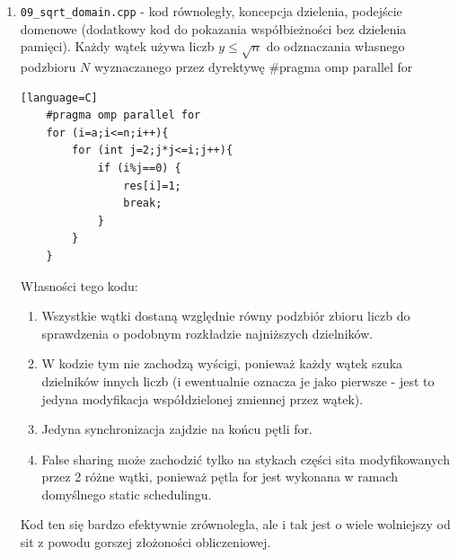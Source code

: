 \documentclass[12pt]{article}
\begin{document}
\begin {enumerate}
	\item \texttt{09\_sqrt\_domain.cpp} - kod równoległy, koncepcja dzielenia, podejście domenowe (dodatkowy kod do pokazania współbieżności bez dzielenia pamięci). Każdy wątek używa liczb \(y\le\sqrt{n}\) do odznaczania własnego podzbioru \(N\) wyznaczanego przez dyrektywę \#pragma omp parallel for
	\begin{lstlisting}[style=mystyle, caption= Sito funkcyjne z dynamic schedulingiem][language=C]
	#pragma omp parallel for
	for (i=a;i<=n;i++){
		for (int j=2;j*j<=i;j++){
			if (i%j==0) {
				res[i]=1;
				break;
			}
		}
	}
	\end{lstlisting}
	Własności tego kodu:
	\begin{enumerate}
		\item Wszystkie wątki dostaną względnie równy podzbiór zbioru liczb do sprawdzenia o podobnym rozkładzie najniższych dzielników.
		\item W kodzie tym nie zachodzą wyścigi, ponieważ każdy wątek szuka dzielników innych liczb (i ewentualnie oznacza je jako pierwsze - jest to jedyna modyfikacja współdzielonej zmiennej przez wątek).
		\item Jedyna synchronizacja zajdzie na końcu pętli for.
		\item False sharing może zachodzić tylko na stykach części sita modyfikowanych przez 2 różne wątki, ponieważ pętla for jest wykonana w ramach domyślnego static schedulingu.
	\end{enumerate}
	Kod ten się bardzo efektywnie zrównolegla, ale i tak jest o wiele wolniejszy od sit z powodu gorszej złożoności obliczeniowej.
\end {enumerate}
\end{document}
